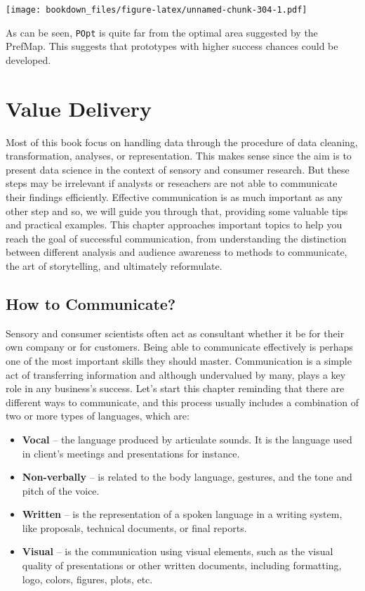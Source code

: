 \documentclass[
]{krantz}
\providecommand{\tightlist}{%
  \setlength{\itemsep}{0pt}\setlength{\parskip}{0pt}}
\renewenvironment{quote}{\begin{VF}}{\end{VF}}
\begin{document}
\texttt{[image: bookdown\_files/figure-latex/unnamed-chunk-304-1.pdf]}

As can be seen, \texttt{POpt} is quite far from the optimal area suggested by the PrefMap. This suggests that prototypes with higher success chances could be developed.

\hypertarget{value-delivery}{%
\chapter{Value Delivery}\label{value-delivery}}

\begin{quote}
Most of this book focus on handling data through the procedure of data cleaning, transformation, analyses, or representation. This makes sense since the aim is to present data science in the context of sensory and consumer research. But these steps may be irrelevant if analysts or reseachers are not able to communicate their findings efficiently. Effective communication is as much important as any other step and so, we will guide you through that, providing some valuable tips and practical examples. This chapter approaches important topics to help you reach the goal of successful communication, from understanding the distinction between different analysis and audience awareness to methods to communicate, the art of storytelling, and ultimately reformulate.
\end{quote}

\hypertarget{how-to-communicate}{%
\section{How to Communicate?}\label{how-to-communicate}}

Sensory and consumer scientists often act as consultant whether it be for their own company or for customers. Being able to communicate effectively is perhaps one of the most important skills they should master. Communication is a simple act of transferring information and although undervalued by many, plays a key role in any business's success. Let's start this chapter reminding that there are different ways to communicate, and this process usually includes a combination of two or more types of languages, which are:

\begin{itemize}
\tightlist
\item
  \textbf{Vocal} -- the language produced by articulate sounds. It is the language used in client's meetings and presentations for instance.
\item
  \textbf{Non-verbally} -- is related to the body language, gestures, and the tone and pitch of the voice.
\item
  \textbf{Written} -- is the representation of a spoken language in a writing system, like proposals, technical documents, or final reports.
\item
  \textbf{Visual} -- is the communication using visual elements, such as the visual quality of presentations or other written documents, including formatting, logo, colors, figures, plots, etc.
\end{itemize}
\end{document}
